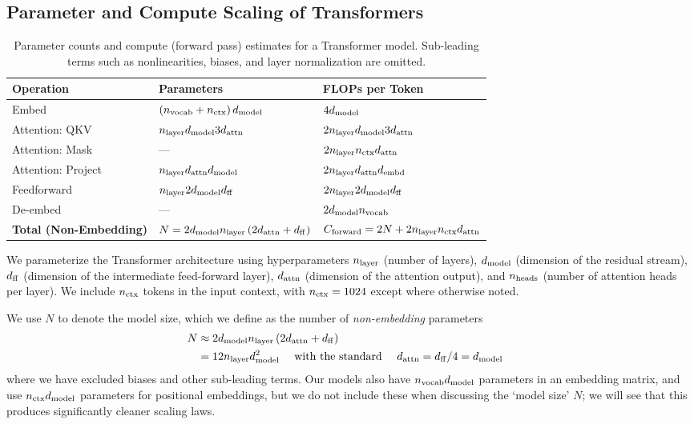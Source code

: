 \documentclass[english]{article}
\begin{document}
\subsection{Parameter and Compute Scaling of Transformers}
\label{sec:ParameterComputeCounts}

\begin{table}[t!]
\centering
\begin{tabular}{|l|l|l|}
\hline 
\textbf{Operation}  & \textbf{Parameters}  & \textbf{FLOPs per Token}\tabularnewline
\hline 
\hline 
Embed  & $\left(n_{{\rm vocab}} + n_{{\rm ctx}}\right)d_{{\rm model}}$  & $4d_{{\rm model}}$\tabularnewline
\hline 
Attention: QKV  & $n_{{\rm layer}}d_{{\rm model}}3d_{{\rm attn}}$  & $2n_{{\rm layer}}d_{{\rm model}}3d_{{\rm attn}}$\tabularnewline
\hline 
Attention: Mask & ---  & $2n_{{\rm layer}}n_{{\rm ctx}}d_{{\rm attn}}$\tabularnewline
\hline 
Attention: Project & $n_{{\rm layer}}d_{{\rm attn}}d_{{\rm model}}$  & $2n_{{\rm layer}}d_{{\rm attn}}d_{{\rm embd}}$\tabularnewline
\hline 
Feedforward  & $n_{{\rm layer}}2d_{{\rm model}}d_{{\rm ff}}$ & $2n_{{\rm layer}}2d_{{\rm model}}d_{{\rm ff}}$\tabularnewline
\hline 
De-embed  & ---  & $2d_{{\rm model}}n_{{\rm vocab}}$\tabularnewline
\hline 
\hline 
\textbf{Total (Non-Embedding)} & $N=2d_{{\rm model}}n_{{\rm layer}}\left(2d_{{\rm attn}}+d_{{\rm ff}}\right)$  & $C_{\mathrm{forward}}=2N+2n_{{\rm layer}}n_{{\rm ctx}}d_{{\rm attn}}$\tabularnewline
\hline 
\end{tabular}
\vspace{1em}
\caption[Parameter and compute counts for Transformer]{Parameter counts and compute (forward pass) estimates for a Transformer model.  Sub-leading terms such as nonlinearities, biases, and layer normalization are omitted. \label{tab:TableTransformerParamsFLOPs}}
\end{table}

 We parameterize the Transformer architecture using hyperparameters $n_{\rm layer}$ (number of layers), $d_{{\rm model}}$ (dimension of the residual stream), $d_{\rm ff}$ (dimension of the intermediate feed-forward layer), $d_{\rm attn}$ (dimension of the attention output), and $n_{\rm heads}$ (number of attention heads per layer).  We include $n_{\rm ctx}$ tokens in the input context, with $n_{\rm ctx} = 1024$ except where otherwise noted.

We use $N$ to denote the model size, which we define as the number of \emph{non-embedding} parameters
\begin{align}
\label{eq:ModelSizeDefinition}
N & \approx  2d_{{\rm model}}n_{{\rm layer}}\left(2d_{{\rm attn}}+d_{{\rm ff}}\right) & \nonumber \\
& = 12 n_{\rm layer} d_{{\rm model}}^2 \quad \text{ with the standard } \quad d_{\rm attn} = d_{\rm ff}/4 = d_{{\rm model}} &
\end{align}
where we have excluded biases and other sub-leading terms.
Our models also have $n_{\rm vocab} d_{{\rm model}}$ parameters in an embedding matrix, and use $n_{\rm ctx} d_{{\rm model}}$ parameters for positional embeddings, but we do not include these when discussing the `model size' $N$; we will see that this produces significantly cleaner scaling laws.
\end{document}
